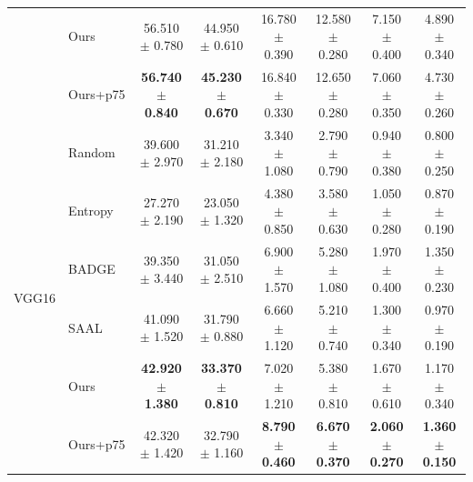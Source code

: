 \begin{table}[t]
{\begin{tabular}{llcccccc}
 & Ours & 56.510 $\pm$ 0.780 & 44.950 $\pm$ 0.610 & 16.780 $\pm$ 0.390 & 12.580 $\pm$ 0.280 & 7.150 $\pm$ 0.400 & 4.890 $\pm$ 0.340 \\
 & Ours+p75 & \textbf{56.740 $\pm$ 0.840} & \textbf{45.230 $\pm$ 0.670} & 16.840 $\pm$ 0.330 & 12.650 $\pm$ 0.280 & 7.060 $\pm$ 0.350 & 4.730 $\pm$ 0.260 \\
\midrule
\multirow{6}{*}{VGG16} & Random & 39.600 $\pm$ 2.970 & 31.210 $\pm$ 2.180 & 3.340 $\pm$ 1.080 & 2.790 $\pm$ 0.790 & 0.940 $\pm$ 0.380 & 0.800 $\pm$ 0.250 \\
 & Entropy & 27.270 $\pm$ 2.190 & 23.050 $\pm$ 1.320 & 4.380 $\pm$ 0.850 & 3.580 $\pm$ 0.630 & 1.050 $\pm$ 0.280 & 0.870 $\pm$ 0.190 \\
 & BADGE & 39.350 $\pm$ 3.440 & 31.050 $\pm$ 2.510 & 6.900 $\pm$ 1.570 & 5.280 $\pm$ 1.080 & 1.970 $\pm$ 0.400 & 1.350 $\pm$ 0.230 \\
 & SAAL & 41.090 $\pm$ 1.520 & 31.790 $\pm$ 0.880 & 6.660 $\pm$ 1.120 & 5.210 $\pm$ 0.740 & 1.300 $\pm$ 0.340 & 0.970 $\pm$ 0.190 \\
 & Ours & \textbf{42.920 $\pm$ 1.380} & \textbf{33.370 $\pm$ 0.810} & 7.020 $\pm$ 1.210 & 5.380 $\pm$ 0.810 & 1.670 $\pm$ 0.610 & 1.170 $\pm$ 0.340 \\
 & Ours+p75 & 42.320 $\pm$ 1.420 & 32.790 $\pm$ 1.160 & \textbf{8.790 $\pm$ 0.460} & \textbf{6.670 $\pm$ 0.370} & \textbf{2.060 $\pm$ 0.270} & \textbf{1.360 $\pm$ 0.150} \\
\bottomrule
\end{tabular}%
}
\end{table}

